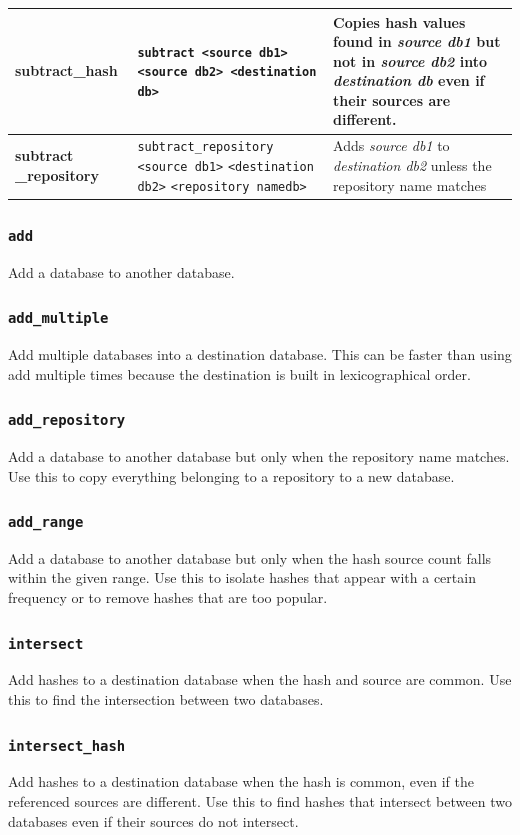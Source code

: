 \documentclass[11pt,fleqn]{article} %
\begin{document}
\begin{table}[!ht]
\begin{tabular}{|p{3.5 cm}|p{6 cm}|p{4 cm}|}
\hline
\textbf{subtract\_hash} & \verb+subtract <source db1>+ \verb+<source db2> <destination db>+&   Copies hash values found in \textit{source db1} but not in \textit{source db2} into \textit{destination db} even if their sources are different.\\
\hline
\textbf{subtract \_repository} & \verb+subtract_repository+ \verb+<source db1>+ \verb+<destination db2>+ \verb+<repository namedb>+ & Adds \textit{source db1} to \textit{destination db2} unless the repository name matches\\
\hline
\end{tabular}
\end{table}

\subsubsection{\texttt{add}}
Add a database to another database.
\subsubsection{\texttt{add\_multiple}}
Add multiple databases into a destination database. This can be faster than using add multiple times because the destination is built in lexicographical order.
\subsubsection{\texttt{add\_repository}}
Add a database to another database but only when the repository name matches. Use this to copy everything belonging to a repository to a new database.
\subsubsection{\texttt{add\_range}}
Add a database to another database but only when the hash source count falls within the given range. Use this to isolate hashes that appear with a certain frequency or to remove hashes that are too popular.
\subsubsection{\texttt{intersect}}
Add hashes to a destination database when the hash and source are common. Use this to find the intersection between two databases.
\subsubsection{\texttt{intersect\_hash}}
Add hashes to a destination database when the hash is common, even if the referenced sources are different. Use this to find hashes that intersect between two databases even if their sources do not intersect.
\end{document}
